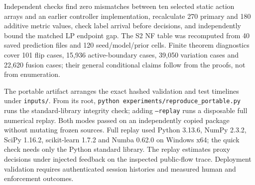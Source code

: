 \documentclass[10pt,onecolumn]{IEEEtran}
\begin{document}
Independent checks find zero mismatches
between ten selected static action
arrays and an earlier controller
implementation, recalculate 270
primary and 180 additive metric values,
check label arrival before decisions,
and independently bound the matched
LP endpoint gap. The S2 NF table
was recomputed from 40 saved prediction
files and 120 seed/model/prior cells.
Finite theorem diagnostics cover
101 flip cases, 15,936 active-boundary
cases, 39,050 variation cases and
22,620 fusion cases; their general
conditional claims follow from the
proofs, not from enumeration.

The portable artifact arranges the exact hashed validation
and test timelines under \texttt{inputs/}. From its root,
\texttt{python experiments/reproduce\_portable.py} runs the
standard-library integrity check; adding \texttt{--replay}
runs a disposable full numerical replay.
Both modes passed on an independently
copied package without mutating frozen
sources. Full replay used Python 3.13.6,
NumPy 2.3.2, SciPy 1.16.2,
scikit-learn 1.7.2 and Numba 0.62.0
on Windows x64; the quick check needs
only the Python standard library.
The replay estimates proxy decisions under
injected feedback on the inspected public-flow
trace. Deployment validation requires
authenticated session histories and measured
human and enforcement outcomes.


\clearpage




\end{document}
